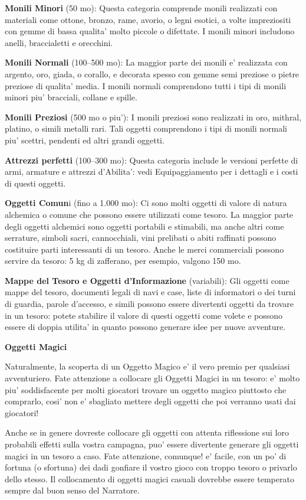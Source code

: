 \documentclass[a4paper,11pt,twoside,openany]{book}
\begin{document}
{		\textbf{Monili Minori} (50 mo): Questa categoria comprende monili realizzati con materiali come ottone, bronzo, rame, avorio, o legni esotici, a volte impreziositi con gemme di bassa qualita' molto piccole o difettate. I monili minori includono anelli, braccialetti e orecchini.
		
		\textbf{Monili Normali} (100--500 mo): La maggior parte dei monili e' realizzata con argento, oro, giada, o corallo, e decorata spesso con gemme semi preziose o pietre preziose di qualita' media. I monili normali comprendono tutti i tipi di monili minori piu' bracciali, collane e spille.
		
		\textbf{Monili Preziosi} (500 mo o piu'): I monili preziosi sono realizzati in oro, mithral, platino, o simili metalli rari. Tali oggetti comprendono i tipi di monili normali piu' scettri, pendenti ed altri grandi oggetti. 
		
		\textbf{Attrezzi perfetti} (100--300 mo): Questa categoria include le versioni perfette di armi, armature e attrezzi d'Abilita': vedi Equipaggiamento per i dettagli e i costi di questi oggetti.
		
		\textbf{Oggetti Comun}i (fino a 1.000 mo): Ci sono molti oggetti di valore di natura alchemica o comune che possono essere utilizzati come tesoro. La maggior parte degli oggetti alchemici sono oggetti portabili e stimabili, ma anche altri come serrature, simboli sacri, cannocchiali, vini prelibati o abiti raffinati possono costituire parti interessanti di un tesoro. Anche le merci commerciali possono servire da tesoro: 5 kg di zafferano, per esempio, valgono 150 mo.
		
		\textbf{Mappe del Tesoro e Oggetti d'Informazione} (variabili): Gli oggetti come mappe del tesoro, documenti legali di navi e case, liste di informatori o dei turni di guardia, parole d'accesso, e simili possono essere divertenti oggetti da trovare in un tesoro: potete stabilire il valore di questi oggetti come volete e possono essere di doppia utilita' in quanto possono generare idee per nuove avventure.
		
		\textbf{Oggetti Magici}
		
		Naturalmente, la scoperta di un Oggetto Magico e' il vero premio per qualsiasi avventuriero. Fate attenzione a collocare gli Oggetti Magici in un tesoro: e' molto piu' soddisfacente per molti giocatori trovare un oggetto magico piuttosto che comprarlo, cosi' non e' sbagliato mettere degli oggetti che poi verranno usati dai giocatori!
		
		Anche se in genere dovreste collocare gli oggetti con attenta riflessione sui loro probabili effetti sulla vostra campagna, puo' essere divertente generare gli oggetti magici in un tesoro a caso. Fate attenzione, comunque! e' facile, con un po' di fortuna (o sfortuna) dei dadi gonfiare il vostro gioco con troppo tesoro o privarlo dello stesso. Il collocamento di oggetti magici casuali dovrebbe essere temperato sempre dal buon senso del Narratore.
		
}
\end{document}
